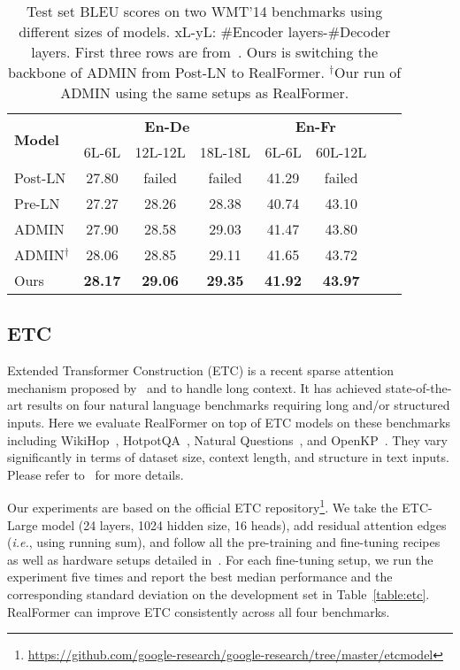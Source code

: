 \documentclass[11pt,a4paper]{article}
\begin{document}
\begin{table}
\setlength{\tabcolsep}{2.7pt}
\centering
\begin{tabular}{l|ccc|cccc} \hline
\multirow{2}{*}{\textbf{Model}}    &\multicolumn{3}{c|}{\textbf{En-De}}     &\multicolumn{2}{c}{\textbf{En-Fr}} \\
                          &\small{6L-6L} &\small{12L-12L} &\small{18L-18L}  &\small{6L-6L} &\small{60L-12L}     \\ \hline
Post-LN                   &27.80    &failed     &failed          &41.29   &failed    \\
Pre-LN                    &27.27    &28.26      &28.38           &40.74   &43.10     \\
ADMIN                     &27.90    &28.58      &29.03           &41.47   &43.80     \\ \hline
ADMIN$^\dagger$           &28.06    &28.85      &29.11           &41.65   &43.72     \\
Ours                      &\textbf{28.17} &\textbf{29.06}        &\textbf{29.35} &\textbf{41.92}   &\textbf{43.97}     \\  \hline
\end{tabular}
\caption{Test set BLEU scores on two WMT'14 benchmarks using different sizes of models. xL-yL: \#Encoder layers-\#Decoder layers. First three rows are from~\citet{Liu-2020-admin}. Ours is switching the backbone of ADMIN from Post-LN to RealFormer. $^\dagger$Our run of ADMIN using the same setups as RealFormer.}
\label{table:nmt}
\end{table}


\subsection{ETC}
Extended Transformer Construction (ETC) is a recent sparse attention mechanism proposed by~\citet{Ainslie-2020-etc} and \citet{Zaheer-2020-bigbird} to handle long context. It has achieved state-of-the-art results on four natural language benchmarks requiring long and/or structured inputs. Here we evaluate RealFormer on top of ETC models on these benchmarks including WikiHop~\citep{Welbl-2018-wikihop}, HotpotQA~\citep{Yang-2018-hotpotqa}, Natural Questions~\citep{Kwiatkowski-2019-nq}, and OpenKP~\citep{Xiong-2019-openkp}. 
They vary significantly in terms of dataset size, context length, and structure in
text inputs. Please refer to~\citet{Ainslie-2020-etc} for more details.

Our experiments are based on the official ETC repository\footnote{\url{https://github.com/google-research/google-research/tree/master/etcmodel}}. We take the ETC-Large model (24 layers, 1024 hidden size, 16 heads), add residual attention edges (\emph{i.e.}, using running sum), and follow all the pre-training and fine-tuning recipes as well as hardware setups detailed in~\citet{Ainslie-2020-etc}.
For each fine-tuning setup, we run the experiment five times and report the best median performance and the corresponding standard deviation on the development set in Table~\ref{table:etc}.
RealFormer can improve ETC consistently across all four benchmarks.
\end{document}
